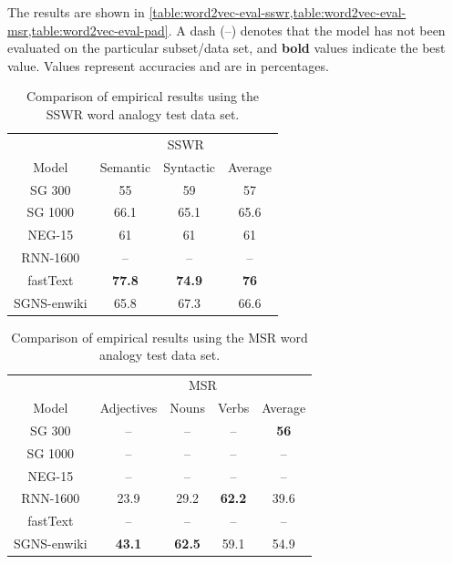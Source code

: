 The results are shown in \cref{table:word2vec-eval-sswr,table:word2vec-eval-msr,table:word2vec-eval-pad}. A dash (--) denotes that the model has not been evaluated on the particular subset/data set, and \textbf{bold} values indicate the best value. Values represent accuracies and are in percentages.
\begin{table}[H]
    \centering
    \begin{tabular}{@{}cccc@{}}
    \toprule
    & \multicolumn{3}{c}{SSWR} \\ \cmidrule(l){2-4}
    \multirow{-2}{*}{Model} & Semantic & Syntactic & Average \\ \midrule
    \trcolor
    SG 300 & 55 & 59 & 57 \\
    SG 1000 & 66.1 & 65.1 & 65.6 \\
    \trcolor
    NEG-15 & 61 & 61 & 61 \\
    RNN-1600 & -- & -- & -- \\
    \trcolor
    fastText & \textbf{77.8} & \textbf{74.9} & \textbf{76} \\
    SGNS-enwiki & 65.8 & 67.3 & 66.6 \\
    \bottomrule
    \end{tabular}
    \caption{Comparison of empirical results using the SSWR word analogy test data set.}
    \label{table:word2vec-eval-sswr}
\end{table}
\begin{table}[H]
     \centering
    \begin{tabular}{@{}ccccc@{}}
    \toprule
    & \multicolumn{4}{c}{MSR} \\
    \cmidrule(l){2-5} 
    \multirow{-2}{*}{Model} & Adjectives & Nouns & Verbs & Average \\
    \midrule
    \trcolor
    SG 300 & -- & -- & -- & \textbf{56} \\
    SG 1000 & -- & -- & -- & -- \\
    \trcolor
    NEG-15 & -- & -- & -- & -- \\
    RNN-1600 & 23.9 & 29.2 & \textbf{62.2} & 39.6 \\
    \trcolor
    fastText & -- & -- & -- & -- \\
    SGNS-enwiki & \textbf{43.1} & \textbf{62.5} & 59.1 & 54.9 \\
    \bottomrule
    \end{tabular}
    \caption{Comparison of empirical results using the MSR word analogy test data set.}
    \label{table:word2vec-eval-msr}
\end{table}
